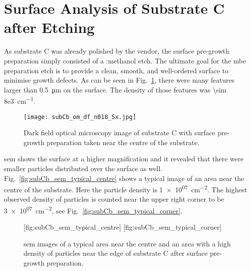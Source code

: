 \clearpage

\section{Surface Analysis of Substrate C after Etching}
As substrate C was already polished by the vendor, the surface pre-growth preparation simply consisted of a :methanol etch.  The ultimate goal for the \ac{mbe} preparation etch is to provide a clean, smooth, and well-ordered surface to minimise growth defects. As can be seen in Fig.~\ref{fig:subCb_om_df}, there were many features larger than \SI{0.5}{\micro\metre} on the surface. The density of those features was \SI{\sim 8e3}{\centi\metre^{-1}}. 

\begin{figure}[htbp]
    \centering
    \texttt{[image: subCb\_om\_df\_n018\_5x.jpg]}
    \caption[Dark field optical microscopy image of substrate C with surface pre-growth preparation.]{Dark field optical microscopy image of substrate C with surface pre-growth preparation taken near the centre of the substrate.}\label{fig:subCb_om_df}
\end{figure}

\Ac{sem} shows the surface at a higher magnification and it revealed that there were smaller particles distributed over the surface as well. Fig.~\ref{fig:subCb_sem_typical_centre} shows a typical image of an area near the centre of the substrate. Here the particle density is  \SI{1e+07}{\centi\metre^{-2}}. The highest observed density of particles is counted near the upper right corner to be \SI{3e+07}{\centi\metre^{-2}}, see Fig.~\ref{fig:subCb_sem_typical_corner}. 

\begin{figure}[htbp]
    [fig:subCb_sem_typical_centre]
    \hfill
    [fig:subCb_sem_typical_corner]
    \caption[\Ac{sem} images of typical areas on substrate C with surface pre-growth preparation.]{\Ac{sem} images of  a typical area near the centre and  an area with a high density of particles near the edge of substrate C after surface pre-growth preparation.}\label{fig:subCb_sem_typical}
\end{figure}

